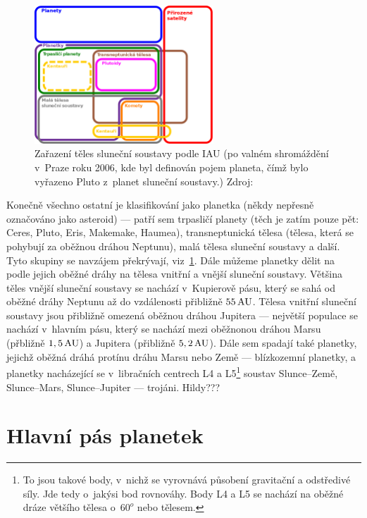 \documentclass[A4paper, 12pt, oneside]{book}%
\begin{document}
\begin{figure}
	\centering
	\includegraphics[width=0.6\textwidth]{obr/ssb.png}
	\caption{Zařazení těles sluneční soustavy podle IAU (po valném shromáždění v~Praze roku 2006, kde byl definován pojem planeta, čímž bylo vyřazeno Pluto z~planet sluneční soustavy.) Zdroj: \cite{wiki:ssb} \label{fig:ssb}}
\end{figure}

Konečně všechno ostatní je klasifikování jako planetka (někdy nepřesně označováno jako asteroid) --- patří sem trpasličí planety (těch je zatím pouze pět: Ceres, Pluto, Eris, Makemake, Haumea), transneptunická tělesa (tělesa, která se pohybují za oběžnou dráhou Neptunu), malá tělesa sluneční soustavy a další. Tyto skupiny se navzájem překrývají, viz~\ref{fig:ssb}. Dále můžeme planetky dělit na podle jejich oběžné dráhy na tělesa vnitřní a vnější sluneční soustavy. Většina těles vnější sluneční soustavy se nachází v~Kupierově pásu, který se sahá od oběžné dráhy Neptunu až do vzdálenosti přibližně $55\, {\rm AU}$. Tělesa vnitřní sluneční soustavy jsou přibližně omezená oběžnou dráhou Jupitera --- největší populace se nachází v~hlavním pásu, který se nachází mezi oběžnonou dráhou Marsu (přbližně $1,5\, {\rm AU}$) a Jupitera (přibližně $5,2\, {\rm AU}$). Dále sem spadají také planetky, jejichž oběžná dráhá protínu dráhu Marsu nebo Země --- blízkozemní planetky, a planetky nacházející se v~libračních centrech L4 a L5\footnote{To jsou takové body, v~nichž se vyrovnává působení gravitační a odstředivé síly. Jde tedy o~jakýsi bod rovnováhy. Body L4 a L5 se nachází na oběžné dráze většího tělesa o~$60^o$  nebo  tělesem.} soustav Slunce--Země, Slunce--Mars, Slunce--Jupiter --- trojáni. Hildy???

\section{Hlavní pás planetek}
\end{document}
